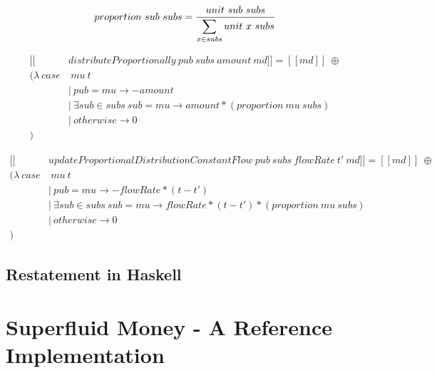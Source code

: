 \documentclass[a4paper,10pt]{report}
\begin{document}
\begin{equation}
    proportion\ sub\ subs = {{ unit\ sub\ subs } \over { \displaystyle \sum_{x \in subs} unit\ x\ subs }}
\end{equation}

\begin{equation}\label{sem_distributeProportionally}
    \begin{split}
        [\![&distributeProportionally\ pub\ subs\ amount\ md]\!] = [\![md]\!]\ \oplus \\
        (\lambda\ case&\ mu\ t \\
        &|\ pub = mu \rightarrow -amount \\
        &|\ \exists sub \in subs\ { sub = mu } \rightarrow amount * (proportion\ mu\ subs) \\
        &|\ otherwise \rightarrow 0 \\
        )
    \end{split}
\end{equation}

\begin{equation}\label{sem_distributeProportionally}
    \begin{split}
        [\![&updateProportionalDistributionConstantFlow\ pub\ subs\ flowRate\ t'\ md]\!] = [\![md]\!]\ \oplus \\
        (\lambda\ case&\ mu\ t \\
        &|\ pub = mu \rightarrow -flowRate * (t - t') \\
        &|\ \exists sub \in subs\ { sub = mu } \rightarrow flowRate * (t - t') * (proportion\ mu\ subs) \\
        &|\ otherwise \rightarrow 0 \\
        )
    \end{split}
\end{equation}

\section{Restatement in Haskell}

\chapter{Superfluid Money - A Reference Implementation}
\end{document}
